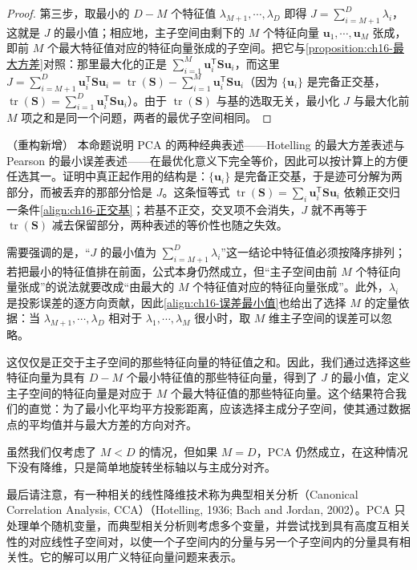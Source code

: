 \documentclass[../../main.tex]{subfiles}
\begin{document}
\begin{proof}
第三步，取最小的 $D-M$ 个特征值 $\lambda_{M+1},\cdots,\lambda_D$ 即得 $J=\sum_{i=M+1}^{D}\lambda_i$，这就是 $J$ 的最小值；相应地，主子空间由剩下的 $M$ 个特征向量 $\bm{u}_1,\cdots,\bm{u}_M$ 张成，即前 $M$ 个最大特征值对应的特征向量张成的子空间。把它与\cref{proposition:ch16-最大方差}对照：那里最大化的正是 $\sum_{i=1}^{M}\bm{u}_i^{\mathsf T}\bm{S}\bm{u}_i$，而这里 $J=\sum_{i=M+1}^{D}\bm{u}_i^{\mathsf T}\bm{S}\bm{u}_i=\operatorname{tr}(\bm{S})-\sum_{i=1}^{M}\bm{u}_i^{\mathsf T}\bm{S}\bm{u}_i$（因为 $\{\bm{u}_i\}$ 是完备正交基，$\operatorname{tr}(\bm{S})=\sum_{i=1}^{D}\bm{u}_i^{\mathsf T}\bm{S}\bm{u}_i$）。由于 $\operatorname{tr}(\bm{S})$ 与基的选取无关，最小化 $J$ 与最大化前 $M$ 项之和是同一个问题，两者的最优子空间相同。
\end{proof}

\begin{remark}（重构新增）
本命题说明 PCA 的两种经典表述——Hotelling 的最大方差表述与 Pearson 的最小误差表述——在最优化意义下完全等价，因此可以按计算上的方便任选其一。证明中真正起作用的结构是：$\{\bm{u}_i\}$ 是完备正交基，于是迹可分解为两部分，而被丢弃的那部分恰是 $J$。这条恒等式 $\operatorname{tr}(\bm{S})=\sum_{i}\bm{u}_i^{\mathsf T}\bm{S}\bm{u}_i$ 依赖正交归一条件\eqref{align:ch16-正交基}；若基不正交，交叉项不会消失，$J$ 就不再等于 $\operatorname{tr}(\bm{S})$ 减去保留部分，两种表述的等价性也随之失效。

需要强调的是，“$J$ 的最小值为 $\sum_{i=M+1}^{D}\lambda_i$”这一结论中特征值必须按降序排列；若把最小的特征值排在前面，公式本身仍然成立，但“主子空间由前 $M$ 个特征向量张成”的说法就要改成“由最大的 $M$ 个特征值对应的特征向量张成”。此外，$\lambda_i$ 是投影误差的逐方向贡献，因此\eqref{align:ch16-误差最小值}也给出了选择 $M$ 的定量依据：当 $\lambda_{M+1},\cdots,\lambda_D$ 相对于 $\lambda_1,\cdots,\lambda_M$ 很小时，取 $M$ 维主子空间的误差可以忽略。
\end{remark}

这仅仅是正交于主子空间的那些特征向量的特征值之和。因此，我们通过选择这些特征向量为具有 $D-M$ 个最小特征值的那些特征向量，得到了 $J$ 的最小值，定义主子空间的特征向量是对应于 $M$ 个最大特征值的那些特征向量。这个结果符合我们的直觉：为了最小化平均平方投影距离，应该选择主成分子空间，使其通过数据点的平均值并与最大方差的方向对齐。

虽然我们仅考虑了 $M<D$ 的情况，但如果 $M=D$，PCA 仍然成立，在这种情况下没有降维，只是简单地旋转坐标轴以与主成分对齐。

最后请注意，有一种相关的线性降维技术称为典型相关分析（Canonical Correlation Analysis, CCA）（Hotelling, 1936; Bach and Jordan, 2002）。PCA 只处理单个随机变量，而典型相关分析则考虑多个变量，并尝试找到具有高度互相关性的对应线性子空间对，以使一个子空间内的分量与另一个子空间内的分量具有相关性。它的解可以用广义特征向量问题来表示。
\end{document}
